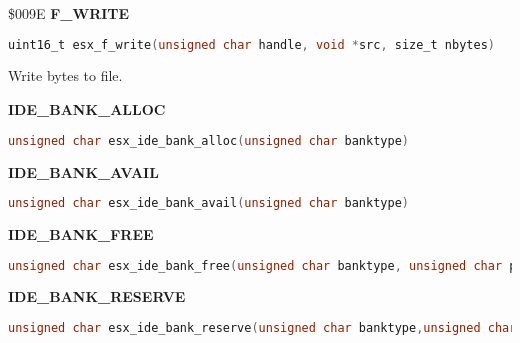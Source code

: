 
\$009E \textbf{F\_WRITE}

\begin{lstlisting}[language=C]
uint16_t esx_f_write(unsigned char handle, void *src, size_t nbytes)
\end{lstlisting}

Write bytes to file.


\textbf{IDE\_BANK\_ALLOC}

\begin{lstlisting}[language=C]
unsigned char esx_ide_bank_alloc(unsigned char banktype)
\end{lstlisting}

\textbf{IDE\_BANK\_AVAIL}

\begin{lstlisting}[language=C]
unsigned char esx_ide_bank_avail(unsigned char banktype)
\end{lstlisting}

\textbf{IDE\_BANK\_FREE}

\begin{lstlisting}[language=C]
unsigned char esx_ide_bank_free(unsigned char banktype, unsigned char page)
\end{lstlisting}

\textbf{IDE\_BANK\_RESERVE}

\begin{lstlisting}[language=C]
unsigned char esx_ide_bank_reserve(unsigned char banktype,unsigned char page)
\end{lstlisting}

